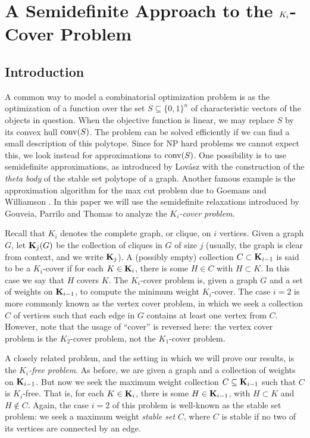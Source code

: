 \chapter{A Semidefinite Approach to the $K_{\lowercase{i}}$-Cover Problem}
\label{chap:kicover}

\section{Introduction}
A common way to model a combinatorial optimization problem is as the optimization of a function over the set $S \subseteq \{0,1\}^n$ of  characteristic vectors of the objects in question. When the objective function is linear, 
we may replace $S$ by its convex hull $\hbox{conv}(S)$. The problem can be solved efficiently if we can find a small description of this polytope. Since for NP hard problems we cannot expect this, we look instead for  approximations to $\hbox{conv}(S)$. One possibility is to use semidefinite approximations, as introduced by Lov\'{a}sz \cite{lovasz} with the construction of the {\em theta body} of the stable set polytope of a graph. Another famous example is the approximation algorithm for the max cut problem due to Goemans and Williamson \cite{goemans_williamson}. In this paper we will use the semidefinite relaxations introduced by Gouveia, Parrilo and Thomas \cite{gpt} to analyze the {\em $K_i$-cover problem}.

Recall that $K_i$ denotes the complete graph, or clique, on $i$ vertices. Given a graph $G$, let $\mathbf{K}_j(G)$ be the collection of cliques in $G$ of size $j$ (usually, the graph is clear from context, and we write $\mathbf{K}_j$). A (possibly empty) collection $C \subset \mathbf{K}_{i-1}$ is said to be a $K_i$-cover if for each $K \in \mathbf{K}_i$, there is some $H \in C$ with $H \subset K$. In this case we say that $H$ covers $K$. The $K_i$-cover problem is, given a graph $G$ and a set of weights on $\mathbf{K}_{i-1}$, to compute the minimum weight $K_i$-cover. The case $i=2$ is more commonly known as the vertex cover problem, in which we seek a collection $C$ of vertices such that each edge in $G$ contains at least one vertex from $C$. However, note that the usage of ``cover'' is reversed here: the vertex cover problem is the $K_2$-cover problem, not the $K_1$-cover problem.

A closely related problem, and the setting in which we will prove our results, is the {\em $K_i$-free problem}. As before, we are given a graph and a collection of weights on $\mathbf{K}_{i-1}$. But now we seek the maximum weight collection $C \subseteq \mathbf{K}_{i-1}$ such that $C$ is $K_i$-free. That is, for each $K \in \mathbf{K}_i$, there is some $H \in \mathbf{K}_{i-1}$, with $H \subset K$ and $H \notin C$. Again, the case $i=2$ of this problem is well-known as the stable set problem: we seek a maximum weight {\em stable set} $C$, where $C$ is stable if no two of its vertices are connected by an edge.

